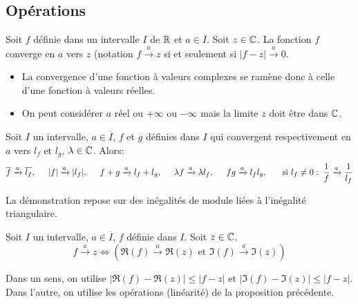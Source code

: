 \subsection{Opérations}
\begin{defi}
  Soit $f$ définie dans un intervalle $I$ de $\mathbb{R}$ et $a\in \overline{I}$. Soit $z\in \mathbb{C}$. La fonction $f$ converge en $a$ vers $z$ (notation $f\xrightarrow{a} z$ si et seulement si $|f-z|\xrightarrow{a} 0$.
\end{defi}
\begin{rems}
  \begin{itemize}
    \item La convergence d'une fonction à valeurs complexes se ramène donc à celle d'une fonction à valeurs réelles.
    \item On peut considérer $a$ réel ou $+\infty$ ou $-\infty$ mais la limite $z$ doit être dans $\mathbb{C}$.
  \end{itemize}
\end{rems}
\begin{prop}
  Soit $I$ un intervalle, $a\in \overline{I}$, $f$ et $g$ définies dans $I$ qui convergent respectivement en $a$ vers $l_f$ et $l_g$, $\lambda \in \mathbb{C}$. Alors:
\begin{displaymath}
\overline{f} \xrightarrow{a} \overline{l_f}, \hspace{0.5cm} |f|\xrightarrow{a} |l_f|, \hspace{0.5cm} f+g \xrightarrow{a}l_f + l_g, \hspace{0.5cm}
\lambda f \xrightarrow{a} \lambda l_f, \hspace{0.5cm} fg \xrightarrow{a} l_f l_g, \hspace{.5cm} \text{ si } l_f\neq 0:\: \frac{1}{f}\xrightarrow{a} \frac{1}{l_f}
\end{displaymath}
\end{prop}
\begin{demo}
  La démonstration repose sur des inégalités de module liées à l'inégalité triangulaire.
\end{demo}
\begin{prop}
  Soit $I$ un intervalle, $a\in \overline{I}$, $f$ définie dans $I$. Soit $z\in \mathbb{C}$.
\begin{displaymath}
  f \xrightarrow{a} z \Leftrightarrow \left( \Re(f) \xrightarrow{a} \Re(z) \text{ et } \Im(f) \xrightarrow{a} \Im(z) \right) 
\end{displaymath}
\end{prop}
\begin{demo}
  Dans un sens, on utilise $|\Re(f) - \Re(z)| \leq |f-z|$ et $|\Im(f) - \Im(z)| \leq |f-z|$. Dans l'autre, on utilise les opérations (linéarité) de la proposition précédente. 
\end{demo}

